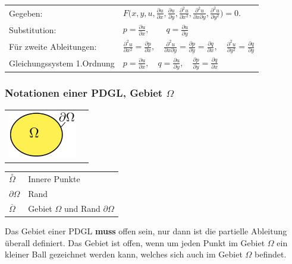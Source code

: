 \begin{tabular}{ll}
Gegeben:& $F\biggl(x,y,u,\frac{\partial u}{\partial x},\frac{\partial u}{\partial y},
\frac{\partial^2 u}{\partial x^2},\frac{\partial^2 u}{\partial x\partial y},
\frac{\partial^2u}{\partial y^2}\biggr)=0.$\\[0.2cm]
Substitution: & $p=\frac{\partial u}{\partial x},\qquad q=\frac{\partial u}{\partial y}$\\[0.2cm]
Für zweite Ableitungen: & $\frac{\partial^2 u}{\partial x^2}=\frac{\partial p}{\partial x},\quad \frac{\partial^2 u}{\partial x\partial y}=\frac{\partial p}{\partial y}=\frac{\partial q}{\partial x},\quad\frac{\partial^2 u}{\partial y^2}=\frac{\partial q}{\partial y}$\\[0.2cm]
Gleichungssystem 1.Ordnung& $p=\frac{\partial u}{\partial x},\quad q=\frac{\partial u}{\partial y},\quad\frac{\partial p}{\partial y}=\frac{\partial q}{\partial x}$
\end{tabular}

\subsubsection{Notationen einer PDGL, Gebiet $\Omega$}
\begin{minipage}{4cm}
	\begin{tabular}{ll}
	\includegraphics[width=3cm]{Content/Theory/Gebiet}&
	\end{tabular}
\end{minipage}
\begin{minipage}{4cm}	
	\begin{tabular}{ll}
		$\overset{\circ}{\Omega}$ & Innere Punkte\\
		$\partial\Omega$ & Rand\\
		$\overset{\_}{\Omega}$ & Gebiet $\Omega$ und Rand $\partial\Omega$\\
	\end{tabular}
\end{minipage}

Das Gebiet einer PDGL \textbf{muss} offen sein, nur dann ist die partielle Ableitung überall definiert. Das Gebiet ist offen, wenn um jeden Punkt im Gebiet $\Omega$ ein kleiner Ball gezeichnet werden kann, welches sich auch im Gebiet $\Omega$ befindet.

